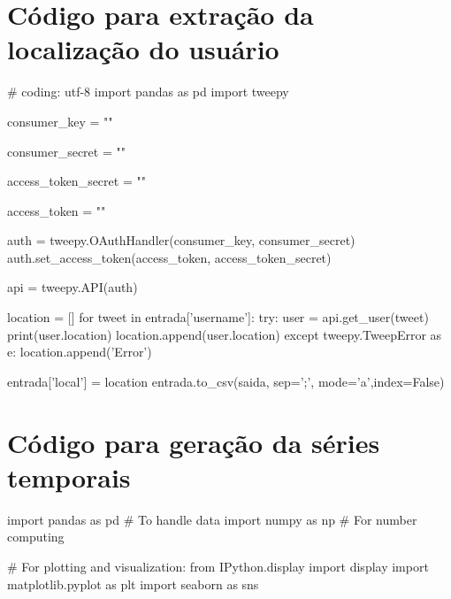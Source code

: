 \section{Código para extração da localização do usuário}
\label{cod:geo}
\begin{python}
    # coding: utf-8
    import pandas as pd  
    import tweepy
    
    consumer_key = ""
    
    consumer_secret = ""
    
    access_token_secret = ""
    
    access_token = ""
    
    auth = tweepy.OAuthHandler(consumer_key, consumer_secret)
    auth.set_access_token(access_token, access_token_secret)
    
    api = tweepy.API(auth)

    location = []
    for tweet in entrada['username']:
        try:
            user = api.get_user(tweet)
            print(user.location)
            location.append(user.location)
        except tweepy.TweepError as e:
            location.append('Error')

    entrada['local'] = location
    entrada.to_csv(saida, sep=';', mode='a',index=False)
    
    
    \end{python}

\section{Código para geração da séries temporais}
\label{cod:time}
\begin{python}
    import pandas as pd     # To handle data
import numpy as np      # For number computing

# For plotting and visualization:
from IPython.display import display
import matplotlib.pyplot as plt
import seaborn as sns
\end{python}